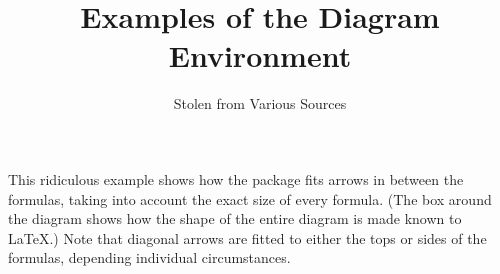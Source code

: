 \documentclass[12pt]{article}\usepackage{pb-diagram}
\title{Examples of the Diagram Environment}
\author{Stolen from Various Sources}
\begin{document}
\maketitle

\setlength{\fboxsep}{0pt}

This ridiculous example shows how the package fits
arrows in between the formulas, taking into  account the
exact size of every formula.  (The box around the diagram
shows how  the shape of the entire diagram is made known to
\LaTeX.)   Note that diagonal  arrows are fitted to either
the tops or sides of the formulas, depending  individual
circumstances.
\begin{center}\end{center}
\end{document}
